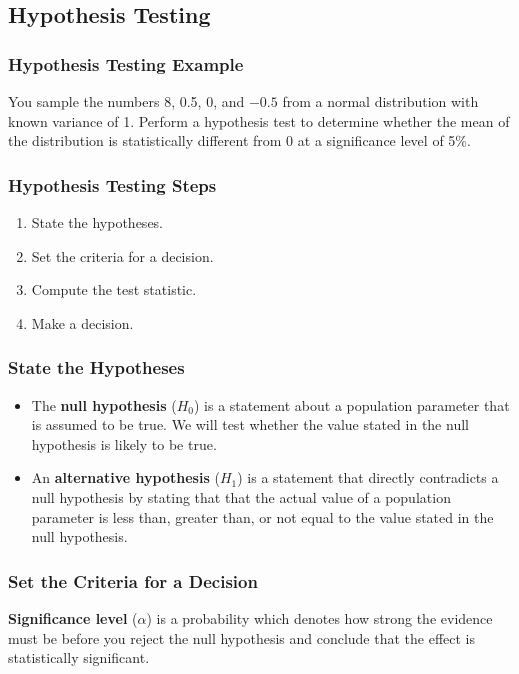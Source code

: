 \documentclass{beamer}
\begin{document}
\subsection{Hypothesis Testing}

\begin{frame}[t]
\frametitle{Hypothesis Testing Example}
\tiny
\begin{Example}
You sample the numbers 8, 0.5, 0, and $-0.5$ from a normal distribution with known variance of 1. Perform a hypothesis test to determine whether the mean of the distribution is statistically different from 0 at a significance level of 5\%.
\end{Example}

\end{frame}

\begin{frame}
\frametitle{Hypothesis Testing Steps}
\begin{enumerate}
\item State the hypotheses.
\item Set the criteria for a decision.
\item Compute the test statistic.
\item Make a decision.
\end{enumerate}
\end{frame}

\begin{frame}
\frametitle{State the Hypotheses}

\begin{Definition}
\begin{itemize}
\item The {\bf null hypothesis} ($H_0$) is a statement about a population parameter that is assumed to be true. We will test whether the value
stated in the null hypothesis is likely to be true.
\item An {\bf alternative hypothesis} ($H_1$) is a statement that directly contradicts a null hypothesis by stating that that the actual value of a population parameter is
less than, greater than, or not equal to the value stated in the null hypothesis.
\end{itemize}
\end{Definition}

\end{frame}

\begin{frame}
\frametitle{Set the Criteria for a Decision}

\begin{Definition}
{\bf Significance level} ($\alpha$) is a probability which denotes how strong the evidence must be before you reject the null hypothesis and conclude that the effect is statistically significant. 
\end{Definition}
\end{frame}
\end{document}
